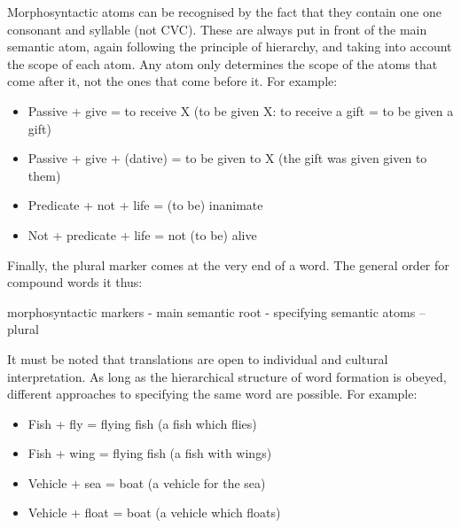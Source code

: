 \noindent 

Morphosyntactic atoms can be recognised by the fact that they contain one one consonant and syllable (not CVC). These are always put in front of the main semantic atom, again following the principle of hierarchy, and taking into account the scope of each atom. Any atom only determines the scope of the atoms that come after it, not the ones that come before it. For example:

\begin{itemize}
\item[] Passive + give = to receive X (to be given X: to receive a gift = to be given a gift) 

 

\item [] Passive + give + (dative) = to be given to X (the gift was given given to them) 

 

\item []Predicate + not + life = (to be) inanimate 

 

\item [] Not + predicate + life = not (to be) alive 

\end{itemize}

\noindent Finally, the plural marker comes at the very end of a word. The general order for compound words it thus:  

\begin{center}
morphosyntactic markers - main semantic root - specifying semantic atoms – plural
\end{center}

It must be noted that translations are open to individual and cultural interpretation. As long as the hierarchical structure of word formation is obeyed, different approaches to specifying the same word are possible. For example: 



\begin{itemize}
\item [] Fish + fly = flying fish (a fish which flies) 

\item[] Fish + wing = flying fish (a fish with wings) 

 

\item[] Vehicle + sea = boat (a vehicle for the sea) 

\item[] Vehicle + float = boat (a vehicle which floats)
\end{itemize}

